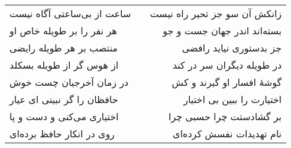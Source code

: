 \begin{center}
\begin{longtable}{l p{0.5cm} r}
ساعت از بی‌ساعتی آگاه نیست
&&
زانکش آن سو جز تحیر راه نیست
\\
هر نفر را بر طویله خاص او
&&
بسته‌اند اندر جهان جست و جو
\\
منتصب بر هر طویله رایضی
&&
جز بدستوری نیاید رافضی
\\
از هوس گر از طویله بسکلد
&&
در طویله دیگران سر در کند
\\
در زمان آخرجیان چست خوش
&&
گوشهٔ افسار او گیرند و کش
\\
حافظان را گر نبینی ای عیار
&&
اختیارت را ببین بی اختیار
\\
اختیاری می‌کنی و دست و پا
&&
بر گشادستت چرا حسبی چرا
\\
روی در انکار حافظ برده‌ای
&&
نام تهدیدات نفسش کرده‌ای
\\
\end{longtable}
\end{center}

